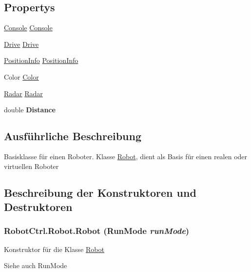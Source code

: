 \subsection*{Propertys}
\begin{DoxyCompactItemize}
\item 
\hyperlink{class_robot_ctrl_1_1_console}{Console} \hyperlink{class_robot_ctrl_1_1_robot_ae78d1691cc943383977741712962bf82}{Console}
\item 
\hyperlink{class_robot_ctrl_1_1_drive}{Drive} \hyperlink{class_robot_ctrl_1_1_robot_a6e1e59f43f8578d78da6c6a19e55f269}{Drive}
\item 
\hyperlink{struct_robot_ctrl_1_1_position_info}{PositionInfo} \hyperlink{class_robot_ctrl_1_1_robot_abf06b5671ccaf469cc251723ec811002}{PositionInfo}
\item 
Color \hyperlink{class_robot_ctrl_1_1_robot_a894338ff794429cdf09647ff8d73d83e}{Color}
\item 
\hyperlink{class_robot_ctrl_1_1_radar}{Radar} \hyperlink{class_robot_ctrl_1_1_robot_adcc563b2531e72dcdfb9af5cafda1cbc}{Radar}
\item 
\hypertarget{class_robot_ctrl_1_1_robot_a9ad5ff537b82e7e39350480bf225e942}{
double {\bfseries Distance}}
\label{class_robot_ctrl_1_1_robot_a9ad5ff537b82e7e39350480bf225e942}

\end{DoxyCompactItemize}


\subsection{Ausführliche Beschreibung}
Basisklasse f\"{u}r einen Roboter. Klasse \hyperlink{class_robot_ctrl_1_1_robot}{Robot}, dient als Basis f\"{u}r einen realen oder virtuellen Roboter 

\subsection{Beschreibung der Konstruktoren und Destruktoren}
\hypertarget{class_robot_ctrl_1_1_robot_acdd921df41328916b058eaad84ed3078}{
\subsubsection[{Robot}]{\setlength{\rightskip}{0pt plus 5cm}RobotCtrl.Robot.Robot (RunMode {\em runMode})}}
\label{class_robot_ctrl_1_1_robot_acdd921df41328916b058eaad84ed3078}
Konstruktor f\"{u}r die Klasse \hyperlink{class_robot_ctrl_1_1_robot}{Robot} \begin{DoxySeeAlso}{Siehe auch}
RunMode
\end{DoxySeeAlso}

